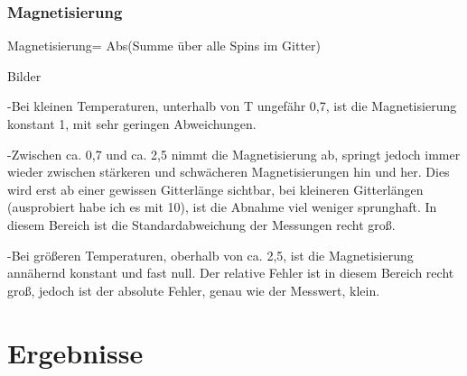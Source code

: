 \documentclass{scrreprt}
\begin{document}
	\subsection{Magnetisierung}
	Magnetisierung= Abs(Summe über alle Spins im Gitter)
	
	Bilder
	
	-Bei kleinen Temperaturen, unterhalb von T ungefähr 0,7, ist die
	 Magnetisierung konstant 1, mit sehr geringen Abweichungen.
	 
	 -Zwischen ca. 0,7 und ca. 2,5 nimmt die Magnetisierung ab, springt jedoch
	 immer wieder zwischen stärkeren und schwächeren Magnetisierungen hin und
	 her. Dies wird erst ab einer gewissen Gitterlänge sichtbar, bei kleineren
	 Gitterlängen (ausprobiert habe ich es mit 10), ist die Abnahme viel weniger
	 sprunghaft. In diesem Bereich ist die Standardabweichung der Messungen recht
	 groß.
	 
	 -Bei größeren Temperaturen, oberhalb von ca. 2,5, ist die Magnetisierung
	 annähernd konstant und fast null. Der relative Fehler ist in diesem Bereich
	 recht groß, jedoch ist der absolute Fehler, genau wie der Messwert, klein.
	\chapter{Ergebnisse}
	\listoffigures
	\listoftables
	
	
	
	\printbibliography[heading=bibintoc]
\end{document}
